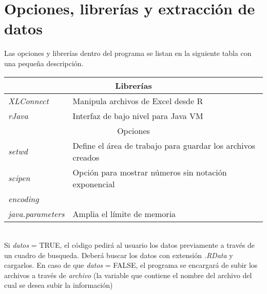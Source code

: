 \documentclass{report}
\begin{document}
\section{Opciones, librerías y extracción de datos}
Las opciones y librerías dentro del programa se listan en la siguiente tabla con una pequeña descripción.\\[0.2cm]
\begin{tabular}{ |l|l|}
        \hline
        \multicolumn{2}{|c|}{Librerías} \\
        \hline
        \textit{XLConnect} & Manipula archivos de Excel desde R \\
        \textit{rJava} & Interfaz de bajo nivel para Java VM\\
        \hline
        \multicolumn{2}{|c|}{Opciones} \\
        \hline
        \textit{setwd} & Define el área de trabajo para guardar los archivos creados\\
        \textit{scipen} & Opción para mostrar números sin notación exponencial\\
        \textit{encoding} & \\
        \textit{java.parameters} & Amplia el límite de memoria\\
        \hline
    \end{tabular}
\\

Si \textit{datos} = TRUE, el código pedirá al usuario los datos previamente a través de un cuadro de busqueda. Deberá buscar los datos con extensión \textit{.RData} y cargarlos. En caso de que \textit{datos} = FALSE, el programa se encargará de subir los archivos a través de \textit{archivo} (la variable que contiene el nombre del archivo del cual se desea subir la información)
\end{document}
